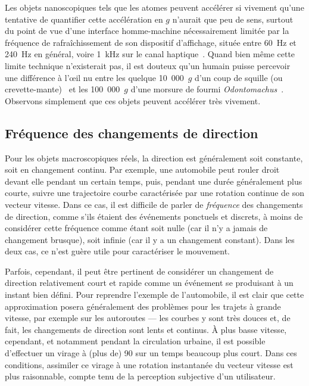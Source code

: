 	Les objets nanoscopiques tels que les atomes peuvent accélérer si vivement qu'une tentative de quantifier cette accélération en $g$ n'aurait que peu de sens, surtout du point de vue d'une interface homme-machine nécessairement limitée par la fréquence de rafraîchissement de son dispositif d'affichage, située entre 60~Hz et 240~Hz en général,\footnotemark{} voire 1~kHz sur le canal haptique~\cite{perret2013interactive}. Quand bien même cette limite technique n'existerait pas, il est douteux qu'un humain puisse percevoir une différence à l'œil nu entre les quelque 10~000~$g$ d'un coup de squille (ou crevette-mante)~\cite{patek2004biomechanics} et les 100~000~$g$ d'une morsure de fourmi \emph{Odontomachus}~\cite{patek2006multifunctionality}. Observons simplement que ces objets peuvent accélérer très vivement.
	
	   
	\FloatBarrier \subsection{Fréquence des changements de direction}
	Pour les objets macroscopiques réels, la direction est généralement soit constante, soit en changement continu. Par exemple, une automobile peut rouler droit devant elle pendant un certain temps, puis, pendant une durée généralement plus courte, suivre une trajectoire courbe caractérisée par une rotation continue de son vecteur vitesse. Dans ce cas, il est difficile de parler de \emph{fréquence} des changements de direction, comme s'ils étaient des événements ponctuels et discrets, à moins de considérer cette fréquence comme étant soit nulle (car il n'y a jamais de changement brusque), soit infinie (car il y a un changement constant). Dans les deux cas, ce n'est guère utile pour caractériser le mouvement.
	
	Parfois, cependant, il peut être pertinent de considérer un changement de direction relativement court et rapide comme un événement se produisant à un instant bien défini. Pour reprendre l'exemple de l'automobile, il est clair que cette approximation posera généralement des problèmes pour les trajets à grande vitesse, par exemple sur les autoroutes --- les courbes y sont très douces et, de fait, les changements de direction sont lents et continus. À plus basse vitesse, cependant, et notamment pendant la circulation urbaine, il est possible d'effectuer un virage à (plus de) 90\textdegree{} sur un temps beaucoup plus court. Dans ces conditions, assimiler ce virage à une rotation instantanée du vecteur vitesse est plus raisonnable, compte tenu de la perception subjective d'un utilisateur.
	
